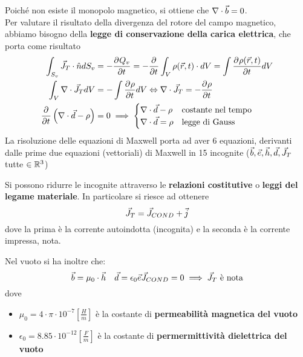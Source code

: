 Poiché non esiste il monopolo magnetico, si ottiene che $\nabla\cdot\vec{b} =0$.\\
Per valutare il risultato della divergenza del rotore del campo magnetico, abbiamo bisogno della
\textbf{legge di conservazione della carica elettrica}, che porta come risultato
\begin{equation}\begin{split}
  \int_{S_v}\vec{J}_T \cdot \hat{n} d S_v &= -\frac{\partial^{} {Q_v}}{\partial {t}^{}} = -\frac{\partial^{} {}}{\partial {t}^{}} \int_V \rho(\vec{r},t) \cdot dV = \int \frac{\partial^{} {\rho(\vec{r},t)}}{\partial {t}^{}} dV\\
  \int_V \nabla\cdot \vec{J}_T dV &= - \int \frac{\partial^{} {\rho}}{\partial {t}^{}} dV \Leftrightarrow \nabla\cdot \vec{J}_T = -\frac{\partial^{} {\rho}}{\partial {t}^{}} \\
  \frac{\partial^{} {}}{\partial {t}^{}} \left(\nabla\cdot \vec{d} - \rho \right) &=0 \implies
  \begin{cases}
    \nabla\cdot \vec{d} - \rho & \text{costante nel tempo} \\
    \nabla\cdot \vec{d} = \rho & \text{legge di Gauss}
  \end{cases}
\end{split}\end{equation}
La risoluzione delle equazioni di Maxwell porta ad aver 6 equazioni, derivanti
dalle prime due equazioni (vettoriali) di Maxwell in 15 incognite ($\vec{b} , \vec{e} , \vec{h} , \vec{d} , \vec{J}_T $ tutte $\in \mathbb{R}^3$)

Si possono ridurre le incognite attraverso le \textbf{relazioni costitutive} o
\textbf{leggi del legame materiale}. In particolare si riesce ad ottenere
\begin{equation}
  \vec{J}_T = \vec{J}_{COND} + \vec{j}
\end{equation}
dove la prima è la corrente autoindotta (incognita) e la seconda è la corrente impressa, nota.

Nel vuoto si ha inoltre che:
\begin{equation}
  \vec{b} = \mu_0 \cdot \vec{h} \quad \vec{d} = \epsilon_0 \vec{e} \\
  \vec{J}_{COND} = 0 \implies \vec{J}_T \text{ è nota} \\
  \label{eq:bh-de-j}
\end{equation}
dove
\begin{itemize}
  \item $\mu_0 = 4\cdot \pi \cdot 10^{-7} \left[\frac{H}{m}\right]$ è la costante di \textbf{permeabilità
  magnetica del vuoto}
  \item $\epsilon_0 = 8.85 \cdot 10^{-12} \left[\frac{F}{m}\right]$ è la costante di \textbf{permermittività
  dielettrica del vuoto}
\end{itemize}


